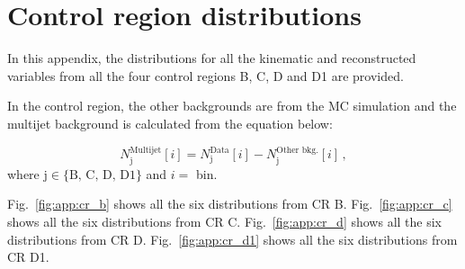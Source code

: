 \chapter{Control region distributions}
\label{sec:app}
In this appendix, the distributions for all the kinematic and reconstructed variables from all the four control regions B, C, D and D1 are provided. 

In the control region, the other backgrounds are from the MC simulation and the multijet background is calculated from the equation below:

\begin{equation}
	N_{\text{j}}^{\text{Multijet}}[i] = N_{\text{j}}^{\text{Data}}[i] - N_{\text{j}}^{\text{Other bkg.}}[i] \,,
	\label{eqn:app}
\end{equation}
where $\text{j}\in\{\text{B, C, D, D1}\}$ and $i=$ bin.

Fig.\ \ref{fig:app:cr_b} shows all the six distributions from CR B. Fig.\ \ref{fig:app:cr_c} shows all the six distributions from CR C. Fig.\ \ref{fig:app:cr_d} shows all the six distributions from CR D. Fig.\ \ref{fig:app:cr_d1} shows all the six distributions from CR D1.

